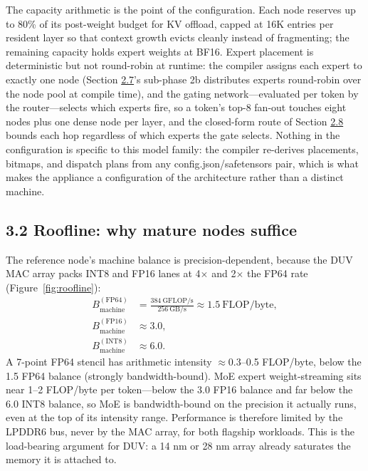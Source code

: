 \documentclass[10pt,twocolumn]{article}
\begin{document}
The capacity arithmetic is the point of the configuration. Each node reserves up to 80\% of its post-weight budget for KV offload, capped at 16K entries per resident layer so that context growth evicts cleanly instead of fragmenting; the remaining capacity holds expert weights at BF16. Expert placement is deterministic but not round-robin at runtime: the compiler assigns each expert to exactly one node (Section \hyperref[sec:2.7]{2.7}'s sub-phase 2b distributes experts round-robin over the node pool at compile time), and the gating network---evaluated per token by the router---selects which experts fire, so a token's top-8 fan-out touches eight nodes plus one dense node per layer, and the closed-form route of Section \hyperref[sec:2.8]{2.8} bounds each hop regardless of which experts the gate selects. Nothing in the configuration is specific to this model family: the compiler re-derives placements, bitmaps, and dispatch plans from any config.json/safetensors pair, which is what makes the appliance a configuration of the architecture rather than a distinct machine.

\subsection*{3.2 Roofline: why mature nodes suffice}\label{sec:3.2}

The reference node's machine balance is precision-dependent, because the DUV MAC array packs INT8 and FP16 lanes at 4$\times$ and 2$\times$ the FP64 rate (Figure~\ref{fig:roofline}):
$$
\begin{aligned}
B_{\mathrm{machine}}^{(\mathrm{FP64})} &= \frac{384\ \mathrm{GFLOP/s}}{256\ \mathrm{GB/s}} \approx 1.5\ \mathrm{FLOP/byte},\\
B_{\mathrm{machine}}^{(\mathrm{FP16})} &\approx 3.0,\\
B_{\mathrm{machine}}^{(\mathrm{INT8})} &\approx 6.0.
\end{aligned}
$$
A 7-point FP64 stencil has arithmetic intensity $\approx$0.3--0.5 FLOP/byte, below the 1.5 FP64 balance (strongly bandwidth-bound)\cite{5}. MoE expert weight-streaming sits near 1--2 FLOP/byte per token---below the 3.0 FP16 balance and far below the 6.0 INT8 balance, so MoE is bandwidth-bound on the precision it actually runs, even at the top of its intensity range. Performance is therefore limited by the LPDDR6 bus, never by the MAC array, for both flagship workloads. This is the load-bearing argument for DUV: a 14 nm or 28 nm array already saturates the memory it is attached to.
\end{document}
